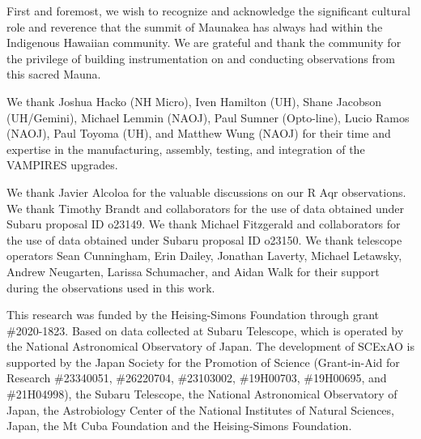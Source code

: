 \begin{acknowledgements}
First and foremost, we wish to recognize and acknowledge the significant cultural role and reverence that the summit of Maunakea has always had within the Indigenous Hawaiian community. We are grateful and thank the community for the privilege of building instrumentation on and conducting observations from this sacred Mauna.

We thank Joshua Hacko (NH Micro), Iven Hamilton (UH), Shane Jacobson (UH/Gemini), Michael Lemmin (NAOJ), Paul Sumner (Opto-line), Lucio Ramos (NAOJ), Paul Toyoma (UH), and Matthew Wung (NAOJ) for their time and expertise in the manufacturing, assembly, testing, and integration of the VAMPIRES upgrades.

We thank Javier Alcoloa for the valuable discussions on our R Aqr observations. We thank Timothy Brandt and collaborators for the use of data obtained under Subaru proposal ID o23149. We thank Michael Fitzgerald and collaborators for the use of data obtained under Subaru proposal ID o23150. We thank telescope operators Sean Cunningham, Erin Dailey, Jonathan Laverty, Michael Letawsky, Andrew Neugarten, Larissa Schumacher, and Aidan Walk for their support during the observations used in this work.

This research was funded by the Heising-Simons Foundation through grant \#2020-1823. Based on data collected at Subaru Telescope, which is operated by the National Astronomical Observatory of Japan. The development of SCExAO is supported by the Japan Society for the Promotion of Science (Grant-in-Aid for Research \#23340051, \#26220704, \#23103002, \#19H00703, \#19H00695, and \#21H04998), the Subaru Telescope, the National Astronomical Observatory of Japan, the Astrobiology Center of the National Institutes of Natural Sciences, Japan, the Mt Cuba Foundation and the Heising-Simons Foundation.
\end{acknowledgements}
